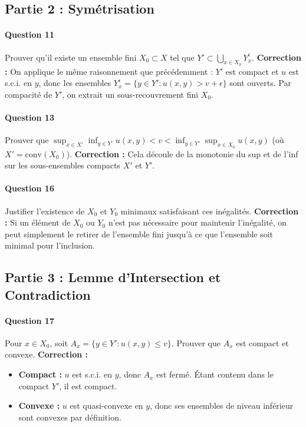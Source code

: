 \subsection{Partie 2 : Symétrisation}

\paragraph{Question 11} Prouver qu'il existe un ensemble fini $X_0 \subset X$ tel que $Y' \subset \bigcup_{x \in X_0} Y_x^\epsilon$.
\textbf{Correction :} On applique le même raisonnement que précédemment : $Y'$ est compact et $u$ est s.c.i. en $y$, donc les ensembles $Y_x^\epsilon = \{y \in Y' : u(x,y) > v + \epsilon\}$ sont ouverts. Par compacité de $Y'$, on extrait un sous-recouvrement fini $X_0$.

\paragraph{Question 13} Prouver que $\sup_{x \in X'} \inf_{y \in Y'} u(x,y) < v < \inf_{y \in Y'} \sup_{x \in X_0} u(x,y)$ (où $X' = \text{conv}(X_0)$).
\textbf{Correction :} Cela découle de la monotonie du sup et de l'inf sur les sous-ensembles compacts $X'$ et $Y'$.

\paragraph{Question 16} Justifier l'existence de $X_0$ et $Y_0$ minimaux satisfaisant ces inégalités.
\textbf{Correction :} Si un élément de $X_0$ ou $Y_0$ n'est pas nécessaire pour maintenir l'inégalité, on peut simplement le retirer de l'ensemble fini jusqu'à ce que l'ensemble soit minimal pour l'inclusion.

\subsection{Partie 3 : Lemme d'Intersection et Contradiction}

\paragraph{Question 17} Pour $x \in X_0$, soit $A_x = \{y \in Y' : u(x,y) \leq v\}$. Prouver que $A_x$ est compact et convexe.
\textbf{Correction :} 
\begin{itemize}
    \item \textbf{Compact :} $u$ est s.c.i. en $y$, donc $A_x$ est fermé. Étant contenu dans le compact $Y'$, il est compact.
    \item \textbf{Convexe :} $u$ est quasi-convexe en $y$, donc ses ensembles de niveau inférieur sont convexes par définition.
\end{itemize}

